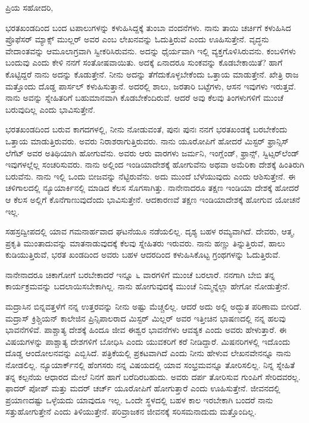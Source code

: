 \noindent
ಪ್ರಿಯ ಸಹೋದರಿ,

ಭರತಖಂಡದಿಂದ ಬಂದ ಟಪಾಲುಗಳನ್ನು ಕಳುಹಿಸಿದ್ದಕ್ಕೆ ತುಂಬಾ ವಂದನೆಗಳು. ನಾನು ತಾಯಿ ಚರ್ಚಿಗೆ ಕಳುಹಿಸಿದ ಪ್ರೊಫೆಸರ್‌ ಮ್ಯಾಕ್ಸ್ ಮುಲ್ಲರ್ ಅವರ  ಎಂಬ ಲೇಖನವನ್ನು ಓದುತ್ತಿರುವೆ ಎಂದು ಊಹಿಸುತ್ತೇನೆ. ವೃದ್ಧನು ವೇದಾಂತವನ್ನು ಆಮೂಲಾಗ್ರವಾಗಿ ಸ್ವೀಕರಿಸಿರುವನು. ಅದನ್ನು ಧೈರ್ಯವಾಗಿ ಇಲ್ಲಿ ವ್ಯಕ್ತಗೊಳಿಸಿರುವನು. ಕಂಬಳಿಗಳು ಬಂದುವು ಎಂದು ಕೇಳಿ ನನಗೆ ಸಂತೋಷವಾಯಿತು. ಅದಕ್ಕೆ ಏನಾದರೂ ಸುಂಕವನ್ನು ಕೊಡಬೇಕಾಯಿತೆ? ಹಾಗೆ ಕೊಟ್ಟಿದ್ದರೆ ನಾನು ಅದನ್ನು ಕೊಡುತ್ತೇನೆ. ನೀನು ಅದನ್ನು ತೆಗೆದುಕೊಳ್ಳಬೇಕೆಂದು ಒತ್ತಾಯ ಮಾಡುತ್ತೇನೆ. ಖೇತ್ರಿ ರಾಜ ಮತ್ತೊಂದು ದೊಡ್ಡ ಪಾರ್ಸಲ್ ಕಳುಹಿಸುತ್ತಾನೆ. ಅದರಲ್ಲಿ ಶಾಲು, ಜರತಾರಿ ಬಟ್ಟೆಗಳು, ಆಸನ ಇವುಗಳು ಇರುತ್ತವೆ. ನಾನು ಅವನ್ನು ಸ್ನೇಹಿತರಿಗೆ ಬಹುಮಾನವಾಗಿ ಕೊಡಬೇಕೆಂದಿರುವೆ. ಆದರೆ ಅವು ಕೆಲವು ತಿಂಗಳುಗಳಿಗೆ ಮುಂಚೆ ಬರುವುದಿಲ್ಲ ಎಂದು ಭಾವಿಸುತ್ತೇನೆ.

ಭರತಖಂಡದಿಂದ ಬರುವ ಕಾಗದಗಳಲ್ಲಿ, ನೀನು ನೋಡುವಂತೆ, ಪುನಃ ಪುನಃ ನನಗೆ ಭರತಖಂಡಕ್ಕೆ ಬರಬೇಕೆಂದು ಒತ್ತಾಯ ಮಾಡುತ್ತಿರುವರು. ಅವರು ನಿರಾಶರಾಗುತ್ತಿರುವರು. ನಾನು ಯೂರೋಪಿಗೆ ಹೋದರೆ ಮಿಸ್ಟರ್ ಫ್ರಾನ್ಸಿಸ್ ಲೆಗೆಟ್ ಅವರ ಅತಿಥಿಯಾಗಿ ಹೋಗುವೆನು. ಅವರು ಆರು ವಾರಗಳು ಜರ್ಮನಿ, ಇಂಗ್ಲೆಂಡ್, ಫ್ರಾನ್ಸ್, ಸ್ವಿಟ್ಸರ್‌ಲೆಂಡ್ ಇವುಗಳಲ್ಲೆಲ್ಲ ಸಂಚರಿಸುವರು. ನಾನು ಅಲ್ಲಿಂದ ಇಂಡಿಯಾದೇಶಕ್ಕೆ ಹೋಗುವೆನು ಅಥವಾ ಅಮೆರಿಕಾ ದೇಶಕ್ಕೆ ಹಿಂತಿರುಗಿ ಬರುವೆನು. ನಾನು ಇಲ್ಲಿ ಒಂದು ಬೀಜವನ್ನು ನೆಟ್ಟಿರುವೆನು. ಅದು ಮುಂದೆ ಬೆಳೆಯುವುದು ಎಂದು ಆಶಿಸುತ್ತೇನೆ. ಈ ಚಳಿಗಾಲದಲ್ಲಿ ನ್ಯೂಯಾರ್ಕಿನಲ್ಲಿ ಮಾಡಿದ ಕೆಲಸ ಸೊಗಸಾಗಿತ್ತು. ನಾನೇನಾದರೂ ತಕ್ಷಣ ಇಂಡಿಯಾ ದೇಶಕ್ಕೆ ಹೋದರೆ ಆ ಕೆಲಸ ಅಲ್ಲಿಗೆ ಕೊನೆಗಾಣುವುದೆಂದು ಭಾವಿಸುತ್ತೇನೆ. ಆದಕಾರಣವೆ ತಕ್ಷಣ ಇಂಡಿಯಾದೇಶಕ್ಕೆ ಹೋಗುವ ಯೋಚನೆ ಇಲ್ಲ.

ಸಹಸ್ರದ್ವೀಪದಲ್ಲಿ ಯಾವ ಗಮನಾರ್ಹವಾದ ಘಟನೆಯೂ ನಡೆಯಲಿಲ್ಲ. ದೃಶ್ಯ ಬಹಳ ರಮ್ಯವಾಗಿದೆ. ದೇವರು, ಆತ್ಮ, ಪ್ರಕೃತಿ ಮುಂತಾದುವನ್ನು ಮಾತನಾಡುವುದಕ್ಕೆ ಕೆಲವು ಸ್ನೇಹಿತರು ಇರುವರು. ನಾನು ಹಣ್ಣು ತಿನ್ನುತ್ತಿರುವೆ, ಹಾಲು ಕುಡಿಯುತ್ತಿರುವೆ, ಭರತ ಖಂಡದಿಂದ ಅವರು ಬಹಳ ಆದರದಿಂದ ಕಳುಹಿಸಿಕೊಟ್ಟ ಗ್ರಂಥಗಳನ್ನು ಓದುತ್ತಿರುವೆ.

ನಾನೇನಾದರೂ ಚಿಕಾಗೋಗೆ ಬರಬೇಕಾದರೆ ಇನ್ನೂ ೬ ವಾರಗಳಿಗೆ ಮುಂಚೆ ಬರಲಾರೆ. ನನಗಾಗಿ ಬೇಬಿ ತನ್ನ ಕಾರ್ಯಕ್ರಮವನ್ನು ಬದಲಾಯಿಸಬೇಕಾಗಿಲ್ಲ. ನಾನು ಹೋಗುವುದಕ್ಕೆ ಮುಂಚೆ ನಿಮ್ಮನ್ನೆಲ್ಲಾ ಹೇಗೋ ನೋಡುತ್ತೇನೆ.

ಮದ್ರಾಸಿನ ಬಿನ್ನವತ್ತಳೆಗೆ ನನ್ನ ಉತ್ತರವನ್ನು ನೀನು ಅಷ್ಟು ಮೆಚ್ಚಲಿಲ್ಲ. ಆದರೆ ಅದು ಅಲ್ಲಿ ಅದ್ಭುತ ಪರಿಣಾಮ ಬೀರಿದೆ. ಮದ್ರಾಸ್ ಕ್ರಿಶ್ಚಿಯನ್ ಕಾಲೇಜಿನ ಪ್ರಿನ್ಸಿಪಾಲರಾದ ಮಿಸ್ಟರ್ ಮಿಲ್ಲರ್‌ ಅವರ ಇತ್ತೀಚಿನ ಭಾಷಣದಲ್ಲಿ ನನ್ನ ಹಲವು ಭಾವನೆಗಳಿವೆ. ಪಾಶ್ಚಾತ್ಯ ದೇಶಕ್ಕೆ ಹಿಂದೂ ಜೀವ ಈಶ್ವರ ಭಾವನೆಗಳು ಆವಶ್ಯಕ ಎಂದು ಅವರು ಹೇಳುತ್ತಾರೆ. ಈ ವಿಷಯಗಳನ್ನು ಪಾಶ್ಚಾತ್ಯ ದೇಶಗಳಿಗೆ ಬೋಧಿಸಿ ಎಂದು ಯುವಕರಿಗೆ ಕರೆ ನೀಡಿದ್ದಾರೆ. ಮಿಷನರಿಗಳಲ್ಲಿ ಇದೊಂದು ದೊಡ್ಡ ಆಂದೋಲನವನ್ನು ಎಬ್ಬಿಸಿದೆ.  ಪತ್ರಿಕೆಯಲ್ಲಿ ಪ್ರಕಟವಾಗಿದೆ ಎಂದು ನೀನು ಹೇಳುವ ಲೇಖನವೇನನ್ನೂ ನಾನು ನೋಡಲಿಲ್ಲ. ನ್ಯೂಯಾರ್ಕ್‌ನಲ್ಲಿ ಹೆಂಗಸರು ನನ್ನ ವಿಷಯದಲ್ಲಿ ಯಾವ ಸಂಭ್ರಮವನ್ನೂ ತೋರಿಸಲಿಲ್ಲ. ನಿನ್ನ ಸ್ನೇಹಿತೆ ತನ್ನ ಕಲ್ಪನೆಯ ಆಧಾರದ ಮೇಲೆ ನಿನಗೆ ಹಾಗೆ ಬರೆದಿರಬಹುದು. ಅವರು ದರ್ಪ ತೋರಿಸುವ ಗುಂಪಿಗೆ ಸೇರಿದವರಲ್ಲ. ಫಾದರ್ ಪೋಪ್ ಮತ್ತು ಮದರ್‌ ಚರ್ಚ್ ಯೂರೋಪಿಗೆ ಹೋಗುತ್ತಾರೆ ಎಂದು ಊಹಿಸುತ್ತೇನೆ. ಜೀವನದಲ್ಲಿ ಪ್ರಯಾಣದಷ್ಟು ಒಳ್ಳೆಯದು ಯಾವುದೂ ಇಲ್ಲ. ಒಂದೇ ಸ್ಥಳದಲ್ಲಿ ಬಹಳ ಕಾಲ ಇರಬೇಕಾಗಿ ಬಂದರೆ ನಾನು ಸತ್ತುಹೋಗುತ್ತೇನೆ ಎಂದು ತಿಳಿಯುತ್ತೇನೆ. ಪರಿವ್ರಾಜಕನ ಜೀವನಕ್ಕೆ ಸರಿಸಮನಾದುದು ಮತ್ತೊಂದಿಲ್ಲ.

